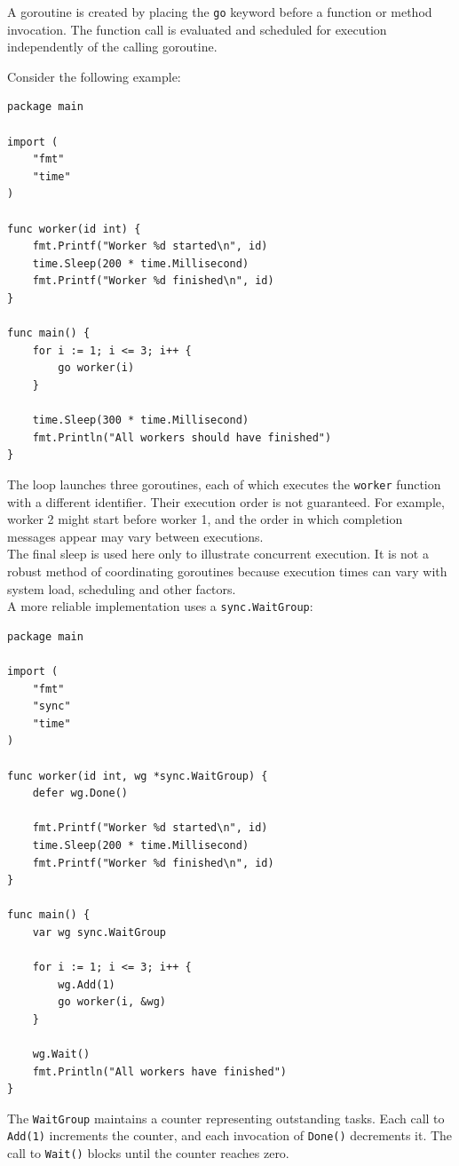 A goroutine is created by placing the \texttt{go} keyword before a function or method invocation. The function call is evaluated and scheduled for execution independently of the calling goroutine.

Consider the following example:

\begin{lstlisting}
package main

import (
    "fmt"
    "time"
)

func worker(id int) {
    fmt.Printf("Worker %d started\n", id)
    time.Sleep(200 * time.Millisecond)
    fmt.Printf("Worker %d finished\n", id)
}

func main() {
    for i := 1; i <= 3; i++ {
        go worker(i)
    }

    time.Sleep(300 * time.Millisecond)
    fmt.Println("All workers should have finished")
}
\end{lstlisting}

The loop launches three goroutines, each of which executes the \texttt{worker} function with a different identifier. Their execution order is not guaranteed. For example, worker 2 might start before worker 1, and the order in which completion messages appear may vary between executions.\\

The final sleep is used here only to illustrate concurrent execution. It is not a robust method of coordinating goroutines because execution times can vary with system load, scheduling and other factors.\\

A more reliable implementation uses a \texttt{sync.WaitGroup}:

\begin{lstlisting}
package main

import (
    "fmt"
    "sync"
    "time"
)

func worker(id int, wg *sync.WaitGroup) {
    defer wg.Done()

    fmt.Printf("Worker %d started\n", id)
    time.Sleep(200 * time.Millisecond)
    fmt.Printf("Worker %d finished\n", id)
}

func main() {
    var wg sync.WaitGroup

    for i := 1; i <= 3; i++ {
        wg.Add(1)
        go worker(i, &wg)
    }

    wg.Wait()
    fmt.Println("All workers have finished")
}
\end{lstlisting}

The \texttt{WaitGroup} maintains a counter representing outstanding tasks. Each call to \texttt{Add(1)} increments the counter, and each invocation of \texttt{Done()} decrements it. The call to \texttt{Wait()} blocks until the counter reaches zero.\\

